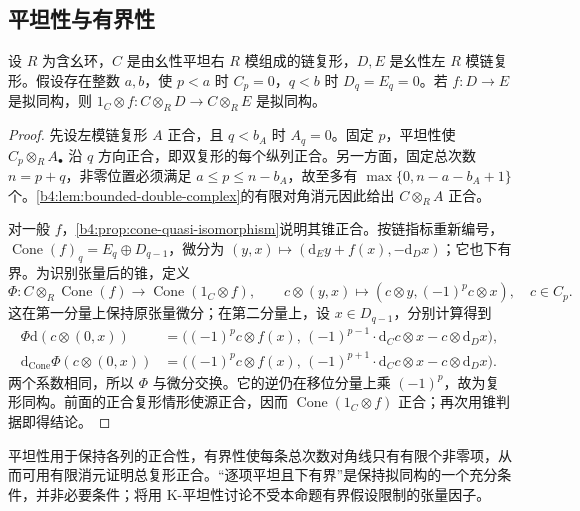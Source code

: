 \subsection{平坦性与有界性}
\label{b4:subsec:0902:02}

\begin{proposition}\label{b4:prop:bounded-flat-tensor}
	设 \(R\) 为含幺环，\(C\) 是由幺性平坦右 \(R\) 模组成的链复形，\(D,E\) 是幺性左 \(R\) 模链复形。假设存在整数 \(a,b\)，使 \(p<a\) 时 \(C_p=0\)，\(q<b\) 时 \(D_q=E_q=0\)。若 \(f:D\to E\) 是拟同构，则 \(1_C\otimes f:C\otimes_R D\to C\otimes_R E\) 是拟同构。
\end{proposition}
\begin{proof}
	先设左模链复形 \(A\) 正合，且 \(q<b_A\) 时 \(A_q=0\)。固定 \(p\)，平坦性使 \(C_p\otimes_R A_\bullet\) 沿 \(q\) 方向正合，即双复形的每个纵列正合。另一方面，固定总次数 \(n=p+q\)，非零位置必须满足 \(a\le p\le n-b_A\)，故至多有 \(\max\{0,n-a-b_A+1\}\) 个。\cref{b4:lem:bounded-double-complex}的有限对角消元因此给出 \(C\otimes_R A\) 正合。

	对一般 \(f\)，\cref{b4:prop:cone-quasi-isomorphism}说明其锥正合。按链指标重新编号，\(\operatorname{Cone}(f)_q=E_q\oplus D_{q-1}\)，微分为 \((y,x)\mapsto(\mathrm{d}_Ey+f(x),-\mathrm{d}_Dx)\)；它也下有界。为识别张量后的锥，定义
	\[
		\Phi:C\otimes_R\operatorname{Cone}(f) \longrightarrow\operatorname{Cone}(1_C\otimes f), \qquad c\otimes(y,x)\longmapsto (c\otimes y,(-1)^pc\otimes x),\quad c\in C_p.
	\]
	这在第一分量上保持原张量微分；在第二分量上，设 \(x\in D_{q-1}\)，分别计算得到
	\[
		\begin{aligned}
			\Phi\mathrm{d}(c\otimes(0,x)) &=\bigl((-1)^pc\otimes f(x),\, (-1)^{p-1}\cdot\mathrm{d}_Cc\otimes x-c\otimes\mathrm{d}_Dx\bigr),\\
			\mathrm{d}_{\operatorname{Cone}}\Phi(c\otimes(0,x)) &=\bigl((-1)^pc\otimes f(x),\, (-1)^{p+1}\cdot\mathrm{d}_Cc\otimes x-c\otimes\mathrm{d}_Dx\bigr).
		\end{aligned}
	\]
	两个系数相同，所以 \(\Phi\) 与微分交换。它的逆仍在移位分量上乘 \((-1)^p\)，故为复形同构。前面的正合复形情形使源正合，因而 \(\operatorname{Cone}(1_C\otimes f)\) 正合；再次用锥判据即得结论。
\end{proof}

平坦性用于保持各列的正合性，有界性使每条总次数对角线只有有限个非零项，从而可用有限消元证明总复形正合。“逐项平坦且下有界”是保持拟同构的一个充分条件，并非必要条件；将用 K-平坦性讨论不受本命题有界假设限制的张量因子。

